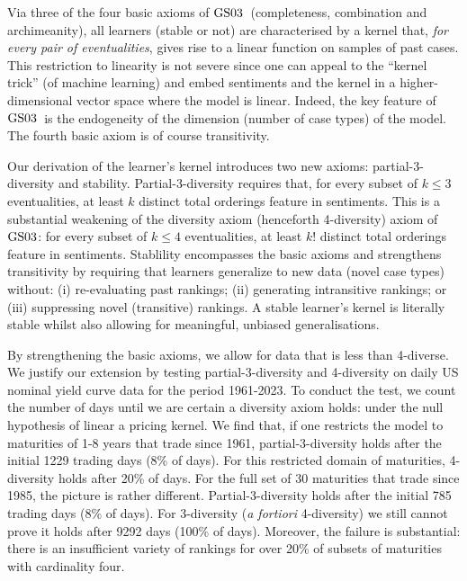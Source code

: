 \documentclass[ecta,nameyear,draft]{econsocart}
\newcommand{\gsii}{$\textup{GS03}$}
\theoremstyle{plain}
\theoremstyle{remark}
\begin{document}
Via three of the four basic axioms of \gsii\ (completeness, combination and
archimeanity), all learners (stable or not) are characterised by a kernel that,
\emph{for every pair of eventualities}, gives rise to a linear function on
samples of past cases. This restriction to linearity is not severe since one
can appeal to the ``kernel trick'' (of machine learning) and embed sentiments
and the kernel in a higher-dimensional vector space where the model is linear.
Indeed, the key feature of \gsii\ is the endogeneity of the dimension (number
of case types) of the model. The fourth basic axiom is of course transitivity.

Our derivation of the learner's kernel introduces two new axioms:
partial-3-diversity and stability. Partial-3-diversity requires that, for every
subset of $k \leq 3$ eventualities, at least $k$ distinct total orderings
feature in {sentiments}. This is a substantial weakening of the diversity axiom
(henceforth 4-diversity) axiom of \gsii: for every subset of $k \leq 4$
eventualities, at least $k!$ distinct total orderings feature in sentiments.
Stablility encompasses the basic axioms and strengthens transitivity
by requiring that learners generalize to new data (novel case types) without:
(i) re-evaluating past rankings; (ii) generating intransitive rankings; or
(iii) suppressing novel (transitive) rankings. A stable learner's kernel is
literally stable whilst also allowing for meaningful, unbiased generalisations.

By strengthening the basic axioms, we allow for data that is less than
4-diverse. We justify our extension by testing partial-3-diversity and
4-diversity on daily US nominal yield curve data for the period 1961-2023. To
conduct the test, we count the number of days until we are certain a diversity
axiom holds: under the null hypothesis of linear a pricing kernel. We find
that, if one restricts the model to maturities of 1-8 years that trade since
1961, partial-3-diversity holds after the initial 1229 trading days (8\% of
days). For this restricted domain of maturities, 4-diversity holds after 20\%
of days. For the full set of 30 maturities that trade since 1985, the picture
is rather different. Partial-3-diversity holds after the initial 785 trading
days (8\% of days). For 3-diversity (\emph{a fortiori} 4-diversity) we still
cannot prove it holds after 9292 days (100\% of days). Moreover, the failure is
substantial: there is an insufficient variety of rankings  for over 20\% of
subsets of maturities with cardinality four.
 
\end{document}
